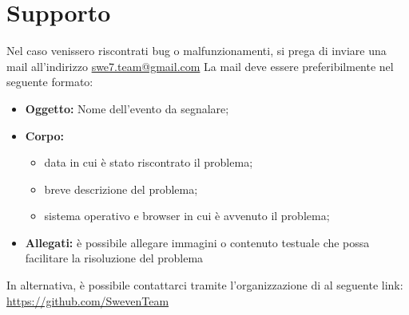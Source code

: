 \section{Supporto}
Nel caso venissero riscontrati bug o malfunzionamenti, si prega di inviare una mail all’indirizzo 
\href{mailto:swe7.team@gmail.com}{\color{blue}swe7.team@gmail.com} \newline 
La mail deve essere preferibilmente nel seguente formato:
\begin{itemize}
    \item \textbf{Oggetto:} Nome dell’evento da segnalare;
    \item \textbf{Corpo:} 
        \begin{itemize}
            \item data in cui è stato riscontrato il problema;
            \item breve descrizione del problema;
            \item sistema operativo e browser in cui è avvenuto il problema;
        \end{itemize}
    \item \textbf{Allegati:} è possibile allegare immagini o contenuto testuale che possa facilitare la risoluzione del problema
\end{itemize}
In alternativa, è possibile contattarci tramite l’organizzazione di  al seguente link:
\href{https://github.com/SwevenTeam}{\color{blue} https://github.com/SwevenTeam} 
